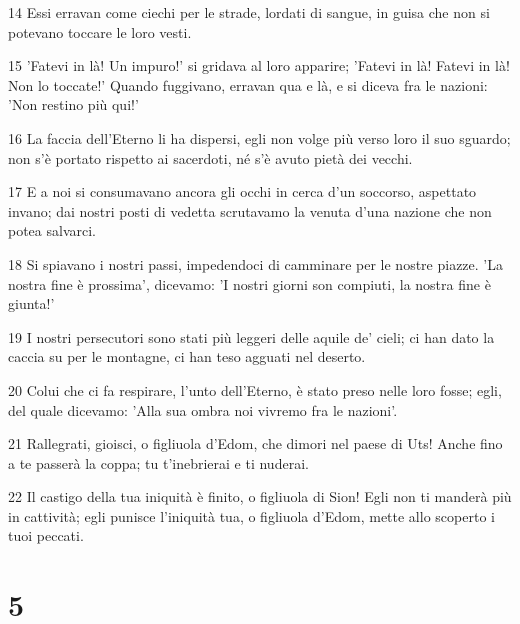 \par 14 Essi erravan come ciechi per le strade, lordati di sangue, in guisa che non si potevano toccare le loro vesti.
\par 15 'Fatevi in là! Un impuro!' si gridava al loro apparire; 'Fatevi in là! Fatevi in là! Non lo toccate!' Quando fuggivano, erravan qua e là, e si diceva fra le nazioni: 'Non restino più qui!'
\par 16 La faccia dell'Eterno li ha dispersi, egli non volge più verso loro il suo sguardo; non s'è portato rispetto ai sacerdoti, né s'è avuto pietà dei vecchi.
\par 17 E a noi si consumavano ancora gli occhi in cerca d'un soccorso, aspettato invano; dai nostri posti di vedetta scrutavamo la venuta d'una nazione che non potea salvarci.
\par 18 Si spiavano i nostri passi, impedendoci di camminare per le nostre piazze. 'La nostra fine è prossima', dicevamo: 'I nostri giorni son compiuti, la nostra fine è giunta!'
\par 19 I nostri persecutori sono stati più leggeri delle aquile de' cieli; ci han dato la caccia su per le montagne, ci han teso agguati nel deserto.
\par 20 Colui che ci fa respirare, l'unto dell'Eterno, è stato preso nelle loro fosse; egli, del quale dicevamo: 'Alla sua ombra noi vivremo fra le nazioni'.
\par 21 Rallegrati, gioisci, o figliuola d'Edom, che dimori nel paese di Uts! Anche fino a te passerà la coppa; tu t'inebrierai e ti nuderai.
\par 22 Il castigo della tua iniquità è finito, o figliuola di Sion! Egli non ti manderà più in cattività; egli punisce l'iniquità tua, o figliuola d'Edom, mette allo scoperto i tuoi peccati.

\chapter{5}

